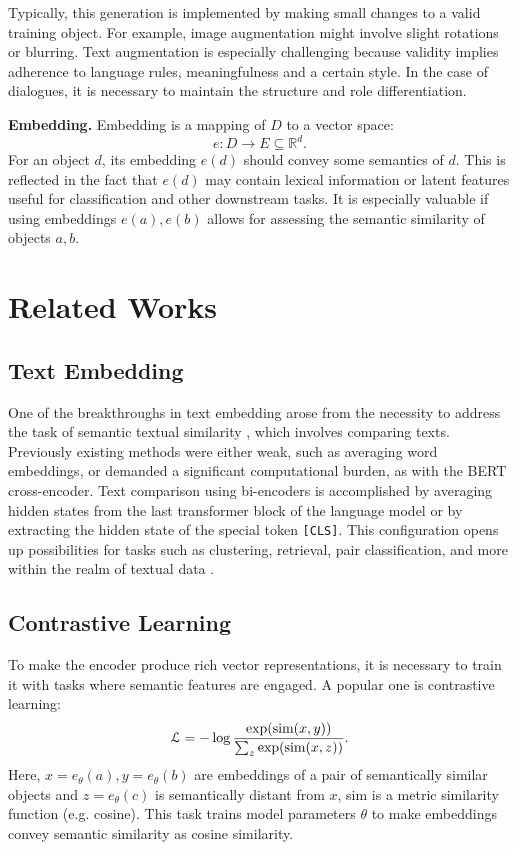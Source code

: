 \documentclass{article}
\begin{document}
Typically, this generation is implemented by making small changes to a valid training object. For example, image augmentation might involve slight rotations or blurring. Text augmentation is especially challenging because validity implies adherence to language rules, meaningfulness and a certain style. In the case of dialogues, it is necessary to maintain the structure and role differentiation.

\textbf{Embedding.} Embedding is a mapping of $D$ to a vector space:
$$
e:D\to E\subseteq\mathbb{R}^d.
$$
For an object $d$, its embedding $e(d)$ should convey some semantics of $d$. This is reflected in the fact that $e(d)$ may contain lexical information or latent features useful for classification and other downstream tasks. It is especially valuable if using embeddings $e(a), e(b)$ allows for assessing the semantic similarity of objects $a, b$.

\section{Related Works}

\subsection{Text Embedding}

One of the breakthroughs in text embedding arose from the necessity to address the task of semantic textual similarity \cite{reimers2019sentencebert}, which involves comparing texts. Previously existing methods were either weak, such as averaging word embeddings, or demanded a significant computational burden, as with the BERT cross-encoder. Text comparison using bi-encoders is accomplished by averaging hidden states from the last transformer block of the language model or by extracting the hidden state of the special token \texttt{[CLS]}. This configuration opens up possibilities for tasks such as clustering, retrieval, pair classification, and more within the realm of textual data \cite{muennighoff2023mteb}.

\subsection{Contrastive Learning}

To make the encoder produce rich vector representations, it is necessary to train it with tasks where semantic features are engaged. A popular one is contrastive learning:
$$
\mathcal{L}=-\log{\exp(\text{sim}(x,y))\over\sum_{z}\exp(\text{sim}(x,z))}.
$$
Here, $x=e_\theta(a), y=e_\theta(b)$ are embeddings of a pair of semantically similar objects and $z=e_\theta(c)$ is semantically distant from $x$, sim is a metric similarity function (e.g. cosine). This task trains model parameters $\theta$ to make embeddings convey semantic similarity as cosine similarity. 
\end{document}
